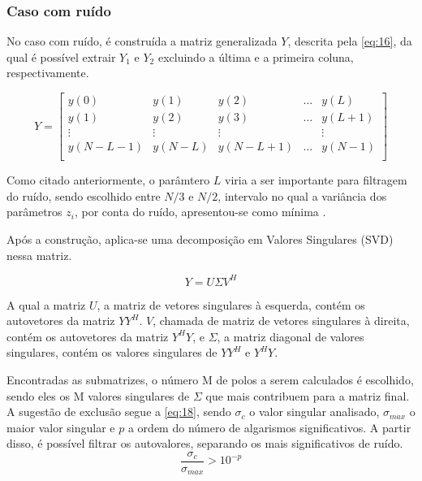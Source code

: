 \documentclass[12pt]{article}
\begin{document}
\subsubsection{Caso com ruído} \label{sec:ruido}

No caso com ruído, é construída a matriz generalizada $Y$, descrita pela \autoref{eq:16}, da qual é possível extrair $Y_1$ e $Y_2$ excluindo a 
última e a primeira coluna, respectivamente. 

\begin{equation} \label{eq:16}
    Y = \begin{bmatrix} y(0) &y(1) & y(2) & \dots & y(L) \\
                        y(1) & y(2) & y(3) & \dots & y(L + 1) \\
                        \vdots & \vdots & \vdots & & \vdots \\
                        y(N - L -1) & y(N-L) & y(N - L + 1) & \dots & y(N-1) \\
    \end{bmatrix}
\end{equation}

Como citado anteriormente, o parâmtero $L$ viria a ser importante para filtragem do ruído, sendo escolhido entre $N/3$ e $N/2$, intervalo no qual 
a variância dos parâmetros $z_i$, por conta do ruído, apresentou-se como mínima \cite{370583}.

Após a construção, aplica-se uma decomposição em Valores Singulares (SVD) nessa matriz. 

\begin{equation} \label{eq:17}
    Y = U \Sigma V^H
\end{equation}

A qual a matriz $U$, a matriz de vetores singulares à esquerda, contém os autovetores da matriz $YY^H$. $V$, chamada de matriz de vetores singulares 
à direita, contém os autovetores da matriz $Y^HY$, e $\Sigma$, a matriz diagonal de valores singulares, contém os valores singulares de $YY^H$ e $Y^HY$.

Encontradas as submatrizes, o número M de polos a serem calculados é escolhido, sendo eles os M valores singulares de $\Sigma$ que mais contribuem para a matriz final. 
A sugestão de exclusão segue a \autoref{eq:18}, sendo $\sigma_c$ o valor singular analisado, $\sigma _{max}$ o maior valor singular e $p$ a ordem do número de algarismos significativos. 
A partir disso, é possível filtrar os autovalores, separando os mais significativos de ruído.
\begin{equation} \label{eq:18}
    \frac{\sigma_c}{\sigma _{max}} > 10^{-p}
\end{equation}
\end{document}
